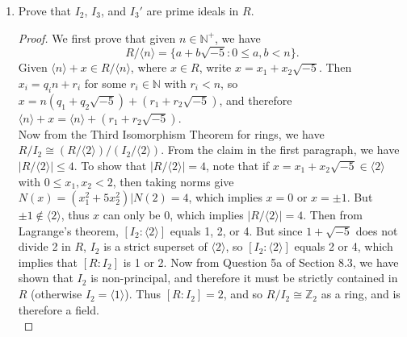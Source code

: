 \documentclass{article}
\begin{document}
\begin{enumerate}[label={\bf(\alph*)}]
\begin{proof}
        Let $1+\sqrt{-5}=xy$ in $R$. Then $N(x)$ and $N(y)$ divides
        $N(1+\sqrt{-5})=6$, and so $N(x)$ must be 1, 2, 3, or 6. We need to
        show that either $x$ or $y$ is a unit in $R$. If $N(x)=1$, 2, or 3,
        then $x=\pm1$, which is a unit. On the other hand, if $N(x)=6$,
        then $x=\pm(1\pm\sqrt{-5})$. $x=\pm(1+\sqrt{-5})$ would give
        $y=\mp1$, which is a unit. So assume $x=\pm(1-\sqrt{-5})$. But such
        $x$ will not divide $1+\sqrt{-5}$ in $R$. Thus $1+\sqrt{-5}$ is
        irreducible in $R$. \\

        The argument for testing that $1-\sqrt{-5}$ is irreducible in $R$
        is analogous with the argument for $1+\sqrt{-5}$. \\

        Since the four given elements are irreducible in $R$ and
        $6=2\cdot3=(1+\sqrt{-5})(1-\sqrt{-5})$, the given factorizations
        are distinct factorizations of 6 into irreducbles in $R$.
      \end{proof}

    \item Prove that $I_2$, $I_3$, and $I_3'$ are prime ideals in $R$.
      \begin{proof}
        We first prove that given $n\in\mathbb{N}^+$, we have
        \[R/\langle n\rangle =\{a+b\sqrt{-5}:0\leq a,b<n\}.\]
        Given $\langle n\rangle+x\in R/\langle n\rangle$, where $x\in R$,
        write $x=x_1+x_2\sqrt{-5}$. Then $x_i=q_in+r_i$ for some
        $r_i\in\mathbb{N}$ with $r_i<n$, so
        $x=n(q_1+q_2\sqrt{-5})+(r_1+r_2\sqrt{-5})$, and therefore $\langle
        n\rangle+x=\langle n\rangle+(r_1+r_2\sqrt{-5})$. \\

        Now from the Third Isomorphism Theorem for rings, we have
        $R/I_2\cong (R/\langle2\rangle)/(I_2/\langle2\rangle)$. From the
        claim in the first paragraph, we have $|R/\langle2\rangle|\leq4$.
        To show that $|R/\langle2\rangle|=4$, note that if
        $x=x_1+x_2\sqrt{-5}\in\langle2\rangle$ with $0\leq x_1,x_2<2$, then
        taking norms give $N(x)=(x_1^2+5x_2^2)|N(2)=4$, which implies $x=0$
        or $x=\pm1$. But $\pm1\not\in\langle2\rangle$, thus $x$ can only be
        $0$, which implies $|R/\langle2\rangle|=4$. Then from Lagrange's
        theorem, $[I_2:\langle2\rangle]$ equals 1, 2, or 4. But since
        $1+\sqrt{-5}$ does not divide 2 in $R$, $I_2$ is a strict superset
        of $\langle2\rangle$, so $[I_2:\langle2\rangle]$ equals 2 or 4,
        which implies that $[R:I_2]$ is 1 or 2. Now from Question 5a of
        Section 8.3, we have shown that $I_2$ is non-principal, and
        therefore it must be strictly contained in $R$ (otherwise
        $I_2=\langle1\rangle$). Thus $[R:I_2]=2$, and so
        $R/I_2\cong\mathbb{Z}_2$ as a ring, and is therefore a field. \\
      \end{proof}
  \end{enumerate}
\end{document}

